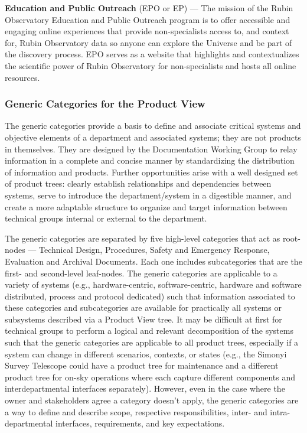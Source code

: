 \textbf{Education and Public Outreach} (EPO or EP) ---
The mission of the Rubin Observatory Education and Public Outreach program is to offer accessible and engaging online experiences that provide non-specialists access to, and context for, Rubin Observatory data so anyone can explore the Universe and be part of the discovery process.
EPO serves as a website that highlights and contextualizes the scientific power of Rubin Observatory for non-specialists and hosts all online resources.

\subsubsection{Generic Categories for the Product View}

The generic categories provide a basis to define and associate critical systems and objective elements of a department and associated systems; they are not products in themselves.
They are designed by the Documentation Working Group to relay information in a complete and concise manner by standardizing the distribution of information and products.
Further opportunities arise with a well designed set of product trees: clearly establish relationships and dependencies between systems, serve to introduce the department/system in a digestible manner, and create a more adaptable structure to organize and target information between technical groups internal or external to the department.

The generic categories are separated by five high-level categories that act as root-nodes --- Technical Design, Procedures, Safety and Emergency Response, Evaluation and Archival Documents.
Each one includes subcategories that are the first- and second-level leaf-nodes.
The generic categories are applicable to a variety of systems (e.g., hardware-centric, software-centric, hardware and software distributed, process and protocol dedicated) such that information associated to these categories and subcategories are available for practically all systems or subsystems described via a Product View tree.
It may be difficult at first for technical groups to perform a logical and relevant decomposition of the systems such that the generic categories are applicable to all product trees, especially if a system can change in different scenarios, contexts, or states (e.g., the Simonyi Survey Telescope could have a product tree for maintenance and a different product tree for on-sky operations where each capture different components and interdepartmental interfaces separately).
However, even in the case where the owner and stakeholders agree a category doesn't apply, the generic categories are a way to define and describe scope, respective responsibilities, inter- and intra-departmental interfaces, requirements, and key expectations.

